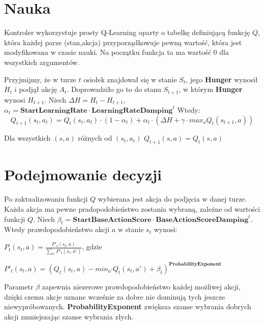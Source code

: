 \section{Nauka}
Kontroler wykorzystuje prosty Q-Learning oparty o tabelkę definiującą funkcję $Q$, która każdej parze (stan,akcja) przyporządkowuje pewną wartość, która jest modyfikowana w czasie nauki. Na początku funkcja ta ma wartość 0 dla wszystkich argumentów.

Przyjmijmy, że w turze $t$ osiołek znajdował się w stanie $S_{t}$, jego \textbf{Hunger} wynosił $H_{t}$ i podjął akcję $A_{t}$. Doprowadziło go to do stanu $S_{t+1}$, w którym \textbf{Hunger} wynosi $H_{t+1}$. Niech $\Delta H = H_{t} - H_{t+1}$, $\alpha_{t} = \textbf{StartLearningRate} \cdot \textbf{LearningRateDamping}^{t}$ Wtedy:
\[Q_{t+1}(s_{t},a_{t})= Q_{t}(s_{t},a_{t}) \cdot (1-\alpha_{t}) + \alpha_{t} \cdot (\Delta H + \gamma \cdot max_{a}Q_{t}(s_{t+1},a))
\]

Dla wszystkich $(s,a)$ różnych od $(s_{t},a_{t})$ $Q_{t+1}(s,a) = Q_{t}(s,a)$

\section{Podejmowanie decyzji}
Po zaktualizowaniu funkcji $Q$ wybierana jest akcja do podjęcia w danej turze. Każda akcja ma pewne pradopodobieństwo zostania wybraną, zależne od wartości funkcji $Q$. Niech $\beta_{t} = \textbf{StartBaseActionScore} \cdot \textbf{BaseActionScoreDamping}^{t}$. Wtedy prawdopodobieństwo akcji $a$ w stanie $s_{t}$ wynosi:

$P_{t}(s_{t},a) = \frac{P'_{t}(s_{t},a)}{\sum_{a'}P'_{t}(s_{t},a')}$, gdzie

$P'_{t}(s_{t},a) = (Q_{t}(s_{t},a) - min_{a'}Q_{t}(s_{t},a') + \beta_{t})^{\textbf{ProbabilityExponent}}$

Parametr $\beta$ zapewnia niezerowe prawdopodobieństwo każdej możliwej akcji, dzięki czemu akcje uznane wcześnie za dobre nie dominują tych jeszcze niewypróbowanych. \textbf{ProbabilityExponent} zwiększa szanse wybrania dobrych akcji zmniejszając szanse wybrania złych.